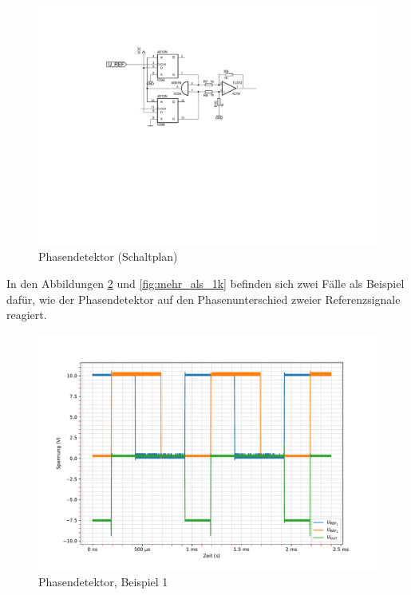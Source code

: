 \begin{figure}[H]
  \centering
  \includegraphics[width=0.8\linewidth]{Elektronik-Laborprotokoll_PLL/Abbildungen/Phasendetektor_Schaltung.pdf}
  \caption{Phasendetektor (Schaltplan)}
  \label{fig:PD_Schaltung}
\end{figure}

In den Abbildungen \ref{fig:kleiner_als_1k} und \ref{fig:mehr_als_1k} befinden sich zwei Fälle als Beispiel dafür, wie der Phasendetektor auf den Phasenunterschied zweier Referenzsignale reagiert.

\begin{figure}[H]
  \centering
  \includegraphics[width=0.8\linewidth]{Elektronik-Laborprotokoll_PLL/Plots/klein_als_1k_unten.pdf}
  \caption{Phasendetektor, Beispiel 1}
  \label{fig:kleiner_als_1k}
\end{figure}

